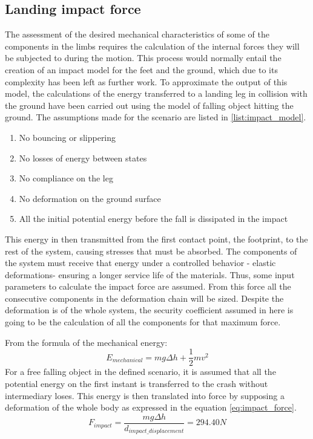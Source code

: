 \subsection{Landing impact force} %
\label{sub:impact_force}
The assessment of the desired mechanical characteristics of some of the components in the limbs requires the calculation of the internal forces they will be subjected to during the motion.
This process would normally entail the creation of an impact model for the feet and the ground, which due to its complexity has been left as further work.
To approximate the output of this model, the calculations of the energy transferred to a landing leg in collision with the ground have been carried out using the model of falling object hitting the ground.
The assumptions made for the scenario are listed in \ref{list:impact_model}.

\begin{enumerate}
\label{list:impact_model}
	\item No bouncing or slippering 
	\item No losses of energy between states
	\item No compliance on the leg
	\item No deformation on the ground surface
	\item All the initial potential energy before the fall is dissipated in the impact 
\end{enumerate}

This energy in then transmitted from the first contact point, the footprint, to the rest of the system, causing stresses that must be absorbed.
The components of the system must receive that energy under a controlled behavior - elastic deformations- ensuring a longer service life of the materials.
Thus, some input parameters to calculate the impact force are assumed.
From this force all the consecutive components in the deformation chain will be sized.
Despite the deformation is of the whole system, the security coefficient assumed in here is going to be the calculation of all the components for that maximum force.

From the formula of the mechanical energy:
\begin{equation}
  E_{mechanical} = m g \Delta h + \frac{1}{2} m v^{2}
\end{equation}
For a free falling object in the defined scenario, it is assumed that all the potential energy on the first instant is transferred to the crash without intermediary loses.
This energy is then translated into force by supposing a deformation of the whole body as expressed in the equation \ref{eq:impact_force}.
\begin{equation}
\label{eq:impact_force}
  F_{impact} = \frac{m g \Delta h}{d_{impact\_displacement}} = 294.40 N 
\end{equation}

